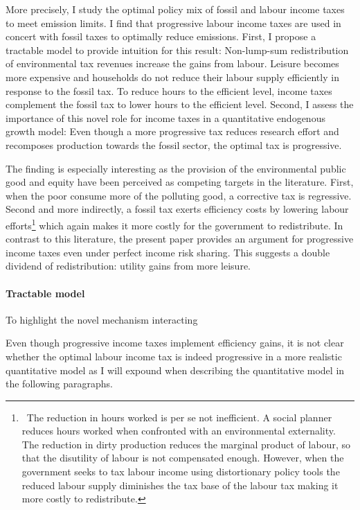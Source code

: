 More precisely, I study the optimal policy mix of fossil and labour income taxes to meet emission limits. 
I find that progressive labour income taxes are used in concert with fossil taxes to optimally reduce emissions. 
 First, I propose a tractable model to provide intuition for this result: Non-lump-sum redistribution of environmental tax revenues increase the gains from labour. Leisure becomes more expensive and households do not reduce their labour supply efficiently in response to the fossil tax. To reduce hours to the efficient level, income taxes complement the fossil tax to lower hours to the efficient level.  
Second, I assess the importance of this novel role for income taxes in a quantitative endogenous growth model:
Even though a more progressive tax reduces research effort  and recomposes production towards the fossil sector, the optimal tax is progressive. 

The finding is especially interesting as the provision of the environmental public good and equity have been perceived as competing targets in the literature. First, when the poor consume more of the polluting good, a corrective tax is regressive. Second and more indirectly, a fossil tax exerts efficiency costs by lowering labour efforts\footnote{\ The reduction in hours worked is per se not inefficient. A social planner reduces hours worked when confronted with an environmental externality. The reduction in dirty production reduces the marginal product of labour, so that the disutility of labour is not compensated enough. However, when the government seeks to tax labour income using distortionary policy tools the reduced labour supply diminishes the tax base of the labour tax making it more costly to redistribute.} which again makes it more costly for the government to redistribute. 
In contrast to this literature, the present paper provides an argument for progressive income taxes even under perfect income risk sharing. This suggests a double dividend of redistribution: utility gains from more leisure.

\paragraph{Tractable model}
To highlight the novel mechanism interacting 

Even though progressive income taxes implement efficiency gains, it is not clear whether the optimal labour income tax is indeed progressive in a more realistic quantitative model as I will expound when describing the quantitative model in the following paragraphs. 

